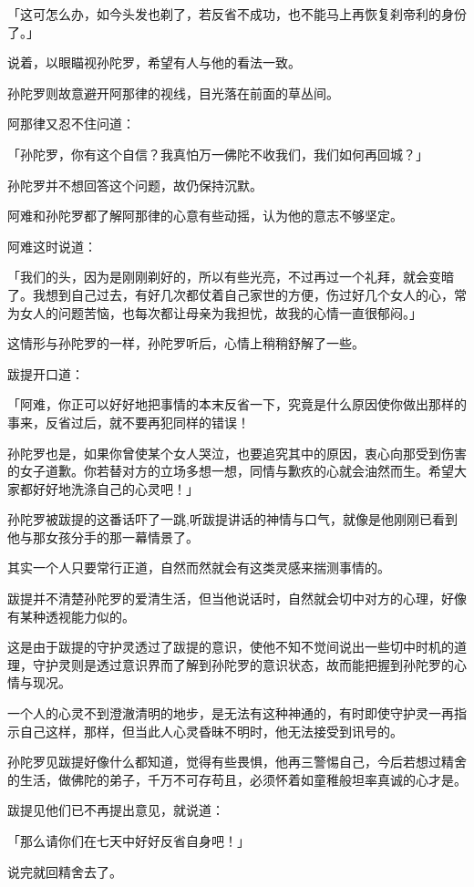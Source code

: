 \documentclass[twoside,openany]{book}
\begin{document}
「这可怎么办，如今头发也剃了，若反省不成功，也不能马上再恢复刹帝利的身份了。」

说着，以眼瞄视孙陀罗，希望有人与他的看法一致。

孙陀罗则故意避开阿那律的视线，目光落在前面的草丛间。

阿那律又忍不住问道：

「孙陀罗，你有这个自信？我真怕万一佛陀不收我们，我们如何再回城？」

孙陀罗并不想回答这个问题，故仍保持沉默。

阿难和孙陀罗都了解阿那律的心意有些动摇，认为他的意志不够坚定。

阿难这时说道：

「我们的头，因为是刚刚剃好的，所以有些光亮，不过再过一个礼拜，就会变暗了。我想到自己过去，有好几次都仗着自己家世的方便，伤过好几个女人的心，常为女人的问题苦恼，也每次都让母亲为我担忧，故我的心情一直很郁闷。」

这情形与孙陀罗的一样，孙陀罗听后，心情上稍稍舒解了一些。

跋提开口道：

「阿难，你正可以好好地把事情的本末反省一下，究竟是什么原因使你做出那样的事来，反省过后，就不要再犯同样的错误！

孙陀罗也是，如果你曾使某个女人哭泣，也要追究其中的原因，衷心向那受到伤害的女子道歉。你若替对方的立场多想一想，同情与歉疚的心就会油然而生。希望大家都好好地洗涤自己的心灵吧！」

孙陀罗被跋提的这番话吓了一跳,听跋提讲话的神情与口气，就像是他刚刚已看到他与那女孩分手的那一幕情景了。

其实一个人只要常行正道，自然而然就会有这类灵感来揣测事情的。

跋提并不清楚孙陀罗的爱清生活，但当他说话时，自然就会切中对方的心理，好像有某种透视能力似的。

这是由于跋提的守护灵透过了跋提的意识，使他不知不觉间说出一些切中时机的道理，守护灵则是透过意识界而了解到孙陀罗的意识状态，故而能把握到孙陀罗的心情与现况。

一个人的心灵不到澄澈清明的地步，是无法有这种神通的，有时即使守护灵一再指示自己这样，那样，但当此人心灵昏昧不明时，他无法接受到讯号的。

孙陀罗见跋提好像什么都知道，觉得有些畏惧，他再三警惕自己，今后若想过精舍的生活，做佛陀的弟子，千万不可存苟且，必须怀着如童稚般坦率真诚的心才是。

跋提见他们已不再提出意见，就说道：

「那么请你们在七天中好好反省自身吧！」

说完就回精舍去了。
\end{document}
